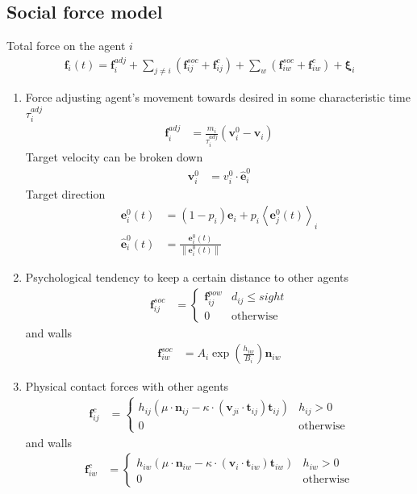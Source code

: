 \subsection{Social force model}
Total force on the agent $ i $
\begin{align}
\mathbf{f}_{i}(t) = \mathbf{f}_{i}^{adj} + \sum_{j\neq i}^{} \left(\mathbf{f}_{ij}^{soc} + \mathbf{f}_{ij}^{c}\right) + \sum_{w}^{} \left(\mathbf{f}_{iw}^{soc} + \mathbf{f}_{iw}^{c}\right) + \boldsymbol{\xi}_{i}
\end{align}

\begin{enumerate}[label=\roman{enumi})]
\item 
Force adjusting agent's movement towards desired in some characteristic time $ \tau_{i}^{adj} $
\begin{align}
\mathbf{f}_{i}^{adj} &= \frac{m_{i}}{\tau_{i}^{adj}} (\mathbf{v}_{i}^{0} - \mathbf{v}_{i}) 
\end{align}
Target velocity can be broken down
\begin{align}
\mathbf{v}_{i}^{0} &= v_{i}^{0} \cdot \hat{\mathbf{e}}_{i}^{0}
\end{align}
Target direction
\begin{align}
\mathbf{e}_{i}^{0}(t) &= (1 - p_{i})\mathbf{e}_{i} + p_{i} \left\langle \mathbf{e}_{j}^{0}(t) \right\rangle_{i} \\
\hat{\mathbf{e}}_{i}^{0}(t) &= \frac{\mathbf{e}_{i}^{0}(t)}{\left\| \mathbf{e}_{i}^{0}(t) \right\|}
\end{align}

\item 
Psychological tendency to keep a certain distance to other agents
\begin{align}
\mathbf{f}_{ij}^{soc} &=
\begin{cases}
\mathbf{f}_{ij}^{pow} &  d_{ij} \leq sight \\
0 & \text{otherwise}
\end{cases}
\end{align}
and walls
\begin{align}
\mathbf{f}_{iw}^{soc} &= A_{i} \exp\left(\frac{h_{iw}}{B_{i}}\right) \mathbf{n}_{iw}
\end{align} 


\item 
Physical contact forces with other agents 
\begin{align}
\mathbf{f}_{ij}^{c} &= 
\begin{cases}
h_{ij} \left(\mu \cdot \mathbf{n}_{ij} - \kappa \cdot \left(\mathbf{v}_{ji} \cdot \mathbf{t}_{ij}\right) \mathbf{t}_{ij}\right) & h_{ij} > 0 \\
0 & \text{otherwise}
\end{cases}
\end{align}
and walls
\begin{align}
\mathbf{f}_{iw}^{c} &= 
\begin{cases}
h_{iw} \left(\mu \cdot \mathbf{n}_{iw} - \kappa \cdot (\mathbf{v}_{i} \cdot \mathbf{t}_{iw}) \mathbf{t}_{iw}\right) & h_{iw} > 0 \\
0 & \text{otherwise}
\end{cases}
\end{align}



\end{enumerate}
